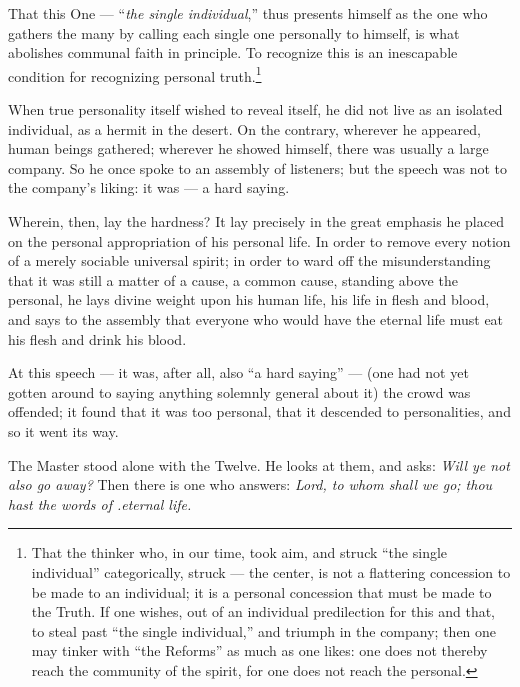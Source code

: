\documentclass[12pt,a4paper]{book}
\begin{document}
That this One --- ``\emph{the single individual},'' thus presents himself as the one who gathers the many by calling each single one personally to himself, is what abolishes communal faith in principle. To recognize this is an inescapable condition for recognizing personal truth.\footnote{That the thinker who, in our time, took aim, and struck ``the single individual'' categorically, struck --- the center, is not a flattering concession to be made to an individual; it is a personal concession that must be made to the Truth. If one wishes, out of an individual predilection for this and that, to steal past ``the single individual,'' and triumph in the company; then one may tinker with ``the Reforms'' as much as one likes: one does not thereby reach the community of the spirit, for one does not reach the personal.}

When true personality itself wished to reveal itself, he did not live as an isolated individual, as a hermit in the
desert. On the contrary, wherever he appeared, human beings gathered; wherever he showed himself, there was usually a large company. So he once spoke to an assembly of listeners; but the speech was not to the company's liking: it was --- a hard saying.

Wherein, then, lay the hardness? It lay precisely in the great emphasis he placed on the personal appropriation of his personal life. In order to remove every notion of a merely sociable universal spirit; in order to ward off the misunderstanding that it was still a matter of a cause, a common cause, standing above the personal, he lays divine weight upon his human life, his life in flesh and blood, and says to the assembly that everyone who would have the eternal life must eat his flesh and drink his blood.

At this speech --- it was, after all, also ``a hard saying'' --- (one had not yet gotten around to saying anything solemnly general about it) the crowd was offended; it found that it was too personal, that it descended to personalities, and so it went its way.

The Master stood alone with the Twelve. He looks at them, and asks: \emph{Will ye not also go away?} Then there is one who answers: \emph{Lord, to whom shall we go; thou hast the words of .eternal life.}
\end{document}
